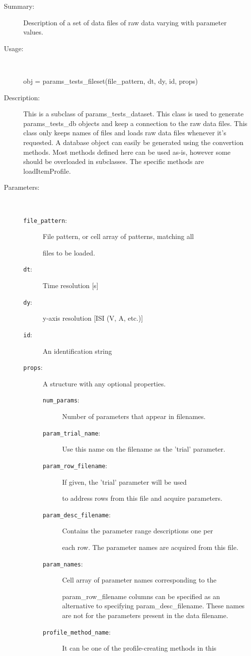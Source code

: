 \begin{description}
\item[Summary:]Description of a set of data files of raw data varying with parameter values.
%
\item[Usage:]~%
\begin{lyxcode}%
obj = params\_tests\_fileset(file\_pattern, dt, dy, id, props)
%
\end{lyxcode}%
%
\item[Description:]%
This is a subclass of params\_tests\_dataset. This class is used to generate 
 params\_tests\_db objects and keep 
 a connection to the raw data files. This class only keeps names of
 files and loads raw data files whenever it's requested. A database
 object can easily be generated using the convertion methods.
 Most methods defined here can 
 be used as-is, however some should be overloaded in subclasses. 
 The specific methods are loadItemProfile.
\item[Parameters:]~
\begin{description}%
\item[\texttt{file\_pattern}:]
 File pattern, or cell array of patterns, matching all 

files to be loaded.\item[\texttt{dt}:]
 Time resolution [s]
\item[\texttt{dy}:]
 y-axis resolution [ISI (V, A, etc.)]
\item[\texttt{id}:]
 An identification string
\item[\texttt{props}:]
 A structure with any optional properties.
\begin{description}%
\item[\texttt{num\_params}:]
 Number of parameters that appear in filenames.
\item[\texttt{param\_trial\_name}:]
 Use this name on the filename as the 'trial' parameter.
\item[\texttt{param\_row\_filename}:]
 If given, the 'trial' parameter will be used

to address rows from this file and acquire parameters.\item[\texttt{param\_desc\_filename}:]
 Contains the parameter range descriptions one per 

each row. The parameter names are acquired from this file.\item[\texttt{param\_names}:]
 Cell array of parameter names corresponding to the 

param\_row\_filename columns can be specified as an alternative to
specifying param\_desc\_filename. These names are not for the 
parameters present in the data filename.\item[\texttt{profile\_method\_name}:]
 It can be one of the profile-creating methods in this


\end{description}
\end{description}
\end{description}
